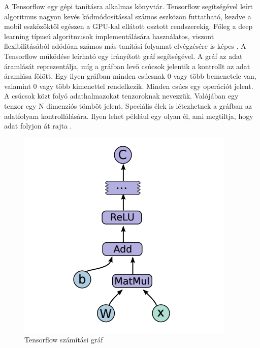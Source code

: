 \documentclass[12pt, a4paper, oneside]{book}
\theoremstyle{tetel}
\begin{document}
A Tensorflow egy gépi tanításra alkalmas könyvtár. Tensorflow segítségével leírt algoritmus nagyon kevés kódmódosítással számos eszközön futtatható, kezdve a mobil eszközöktől egészen a GPU-kal ellátott osztott rendszerekig. Főleg a deep learning típusú algoritmusok implementálására használatos, viszont flexibilitásából adódóan számos más tanítási folyamat elvégzésére is képes \cite{35}.
\newline
\indent
A Tensorflow működése leírható egy irányított gráf segítségével. A gráf az adat áramlását reprezentálja, míg a gráfban levő csúcsok jelentik a kontrollt az adat áramlása fölött. Egy ilyen gráfban minden csúcsnak 0 vagy több bemenetele van, valamint 0 vagy több kimenettel rendelkezik. Minden csúcs egy operációt jelent. A csúcsok közt folyó adathalmazokat tenzoroknak nevezzük. Valójában egy tenzor egy N dimenziós tömböt jelent. Speciális élek is létezhetnek a gráfban az adatfolyam kontrollálására. Ilyen lehet például egy olyan él, ami megtiltja, hogy adat folyjon át rajta \cite{35}.

\begin{figure}[!htbp]
	\begin{center}
		\includegraphics[scale=0.8]{tensorflow_graph.png}
		\caption{Tensorflow számítási gráf\cite{35}}
		\label{tensorflow_graph}
	\end{center}
\end{figure}
\end{document}
